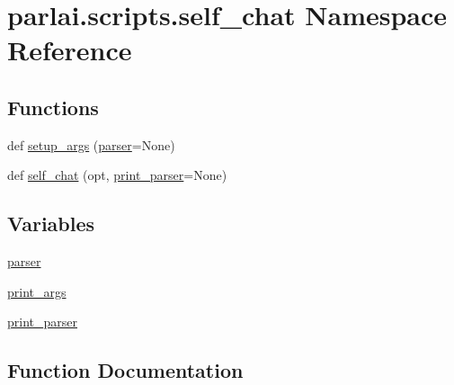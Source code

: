 \hypertarget{namespaceparlai_1_1scripts_1_1self__chat}{}\section{parlai.\+scripts.\+self\+\_\+chat Namespace Reference}
\label{namespaceparlai_1_1scripts_1_1self__chat}
\subsection*{Functions}
\begin{DoxyCompactItemize}
\item 
def \hyperlink{namespaceparlai_1_1scripts_1_1self__chat_a0899a6bf4e3d48c81a2c1b97f9696714}{setup\+\_\+args} (\hyperlink{namespaceparlai_1_1scripts_1_1self__chat_af9db75a43048606dded47ed0003b9014}{parser}=None)
\item 
def \hyperlink{namespaceparlai_1_1scripts_1_1self__chat_a3b20ced8dd92830f75efb0dc18269794}{self\+\_\+chat} (opt, \hyperlink{namespaceparlai_1_1scripts_1_1self__chat_a41f7dd601db93d7b7f5edfa0da0ab336}{print\+\_\+parser}=None)
\end{DoxyCompactItemize}
\subsection*{Variables}
\begin{DoxyCompactItemize}
\item 
\hyperlink{namespaceparlai_1_1scripts_1_1self__chat_af9db75a43048606dded47ed0003b9014}{parser}
\item 
\hyperlink{namespaceparlai_1_1scripts_1_1self__chat_abd2d21a5ab8bcf97f9c1f42a6b93c7e2}{print\+\_\+args}
\item 
\hyperlink{namespaceparlai_1_1scripts_1_1self__chat_a41f7dd601db93d7b7f5edfa0da0ab336}{print\+\_\+parser}
\end{DoxyCompactItemize}


\subsection{Function Documentation}
\mbox{\label{namespaceparlai_1_1scripts_1_1self__chat_a3b20ced8dd92830f75efb0dc18269794}} 
